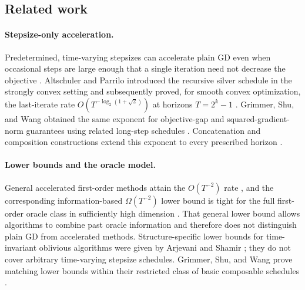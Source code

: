 \documentclass[11pt]{article}
\theoremstyle{definition}
\theoremstyle{remark}
\begin{document}
\subsection{Related work}

\paragraph{Stepsize-only acceleration.}
Predetermined, time-varying stepsizes can accelerate plain GD even when
occasional steps are large enough that a single iteration need not decrease
the objective
\cite{grimmer2024long,altschulerparrilo2025hedging,
altschuler2025silver,grimmershuwang2025long}.
Altschuler and Parrilo introduced the recursive silver schedule in the
strongly convex setting and subsequently proved, for smooth convex
optimization, the last-iterate rate
\(O(T^{-\log_2(1+\sqrt2)})\) at horizons \(T=2^k-1\)
\cite{altschulerparrilo2025hedging,altschuler2025silver}.
Grimmer, Shu, and Wang obtained the same exponent for objective-gap and
squared-gradient-norm guarantees using related long-step schedules
\cite{grimmershuwang2025long}.  Concatenation and composition constructions
extend this exponent to every prescribed horizon
\cite{zhangjiang2024,grimmershuwang2025compose}.

\paragraph{Lower bounds and the oracle model.}
General accelerated first-order methods attain the \(O(T^{-2})\) rate
\cite{nesterov1983}, and the corresponding information-based
\(\Omega(T^{-2})\) lower bound is tight for the full first-order oracle class
in sufficiently high dimension \cite{drori2016}.  That general lower bound
allows algorithms to combine past oracle information and therefore does not
distinguish plain GD from accelerated methods.  Structure-specific lower
bounds for time-invariant oblivious algorithms were given by Arjevani and
Shamir \cite{arjevanishamir2016}; they do not cover arbitrary time-varying
stepsize schedules.  Grimmer, Shu, and Wang prove matching lower bounds
within their restricted class of basic composable schedules
\cite{grimmershuwang2025compose}.
\end{document}
